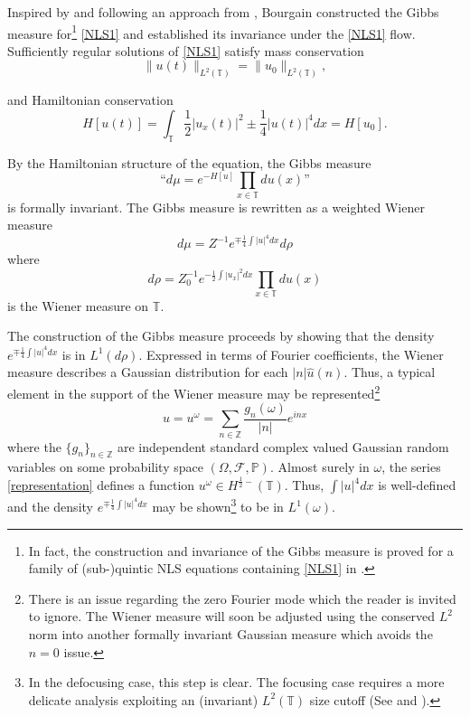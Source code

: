 \documentclass[11pt]{amsart}
\numberwithin{equation}{section} \numberwithin{theorem}{section}
\begin{document}
Inspired by \cite{Lebowitz:1988p737} and following an approach from \cite{Zhidkov:1994p834}, Bourgain \cite{Bourgain:1994p435}
constructed  the Gibbs measure for{\footnote{In fact, the construction and invariance of the Gibbs measure is proved for a family of (sub-)quintic NLS equations containing \eqref{NLS1} in \cite{Bourgain:1994p435}.}} \eqref{NLS1} and established its invariance under the \eqref{NLS1} flow. Sufficiently regular solutions of \eqref{NLS1} satisfy mass conservation 
\begin{equation}
	\label{mass} \| u(t ) \|_{L^2({\mathbb{T}})} = \| u_0 \|_{L^2 ({\mathbb{T}})}, 
\end{equation}

{
\noindent} and Hamiltonian conservation 
\begin{equation}
	\label{Hamiltonian} H[u(t) ] = \int_{\mathbb{T}} \frac{1}{2} |u_x (t) |^2 \pm \frac{1}{4} |u(t)|^4 dx = H[u_0]. 
\end{equation}

{
\noindent} By the Hamiltonian structure of the equation, the Gibbs measure 
\begin{equation}
	\label{GibbsMeasure} \text{``}d \mu = e^{-H[u]} \prod_{x \in {\mathbb{T}}} du(x)\text{''} 
\end{equation}
is formally invariant. The Gibbs measure is rewritten as a weighted Wiener measure 
\begin{equation}
	\label{WeightedWiener} d \mu = Z^{-1} e^{\mp \frac{1}{4} \int|u|^4 dx} d\rho 
\end{equation}
where 
\begin{equation}
	\label{Wiener} d \rho = Z_0^{-1} e^{-\frac{1}{2} \int |u_x|^2 dx} \prod_{x \in {\mathbb{T}}} du(x) 
\end{equation}
is the Wiener measure on ${\mathbb{T}}$.

The construction of the Gibbs measure proceeds by showing that the density $ e^{\mp \frac{1}{4} \int|u|^4 dx}$ is in $ L^1 (d \rho)$. Expressed in terms of Fourier coefficients, the Wiener measure describes a Gaussian distribution for each $|n| \widehat{u} (n)$. Thus, a typical element in the support of the Wiener measure may be represented{\footnote{There is an issue regarding the zero Fourier mode which the reader is invited to ignore. The Wiener measure will soon be adjusted using the conserved $L^2$ norm into another formally invariant Gaussian measure which avoids the $n=0$ issue.}} 
\begin{equation}
	\label{representation} u = u^\omega = \sum_{n \in {\mathbb{Z}}} \frac{g_n (\omega)}{|n|} e^{i n x} 
\end{equation}
where the $\{ g_n \}_{n \in \mathbb{Z}}$ are independent standard complex valued Gaussian random variables
on some probability space $(\Omega, \mathcal{F}, \mathbb{P})$.
Almost surely in $\omega$, the series \eqref{representation} defines a function $u^\omega \in H^{\frac{1}{2}-} ({\mathbb{T}})$. Thus, $\int |u|^4 dx $ is well-defined and the density $e^{\mp \frac{1}{4} \int|u|^4 dx} $ may be shown{\footnote{In the defocusing case, this step is clear. The focusing case requires a more delicate analysis exploiting an (invariant) $L^2({\mathbb{T}})$ size cutoff (See \cite{Lebowitz:1988p737} and \cite{Bourgain:1994p435}).}} to be in $L^1 ( \omega).$
\end{document}
